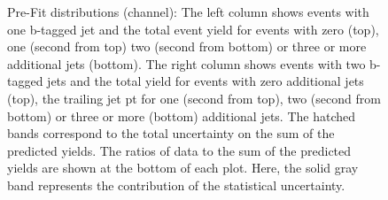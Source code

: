 \begin{figure}[htbp!]
\begin{center}
\caption{Pre-Fit distributions (\ee channel): 
  The left column shows events with one b-tagged jet and the total event yield for events with zero (top), one (second from top)
  two (second from bottom) or three or more additional jets (bottom).
  The right column shows events with two b-tagged jets and the total yield for events with zero additional jets (top),
  the trailing jet pt for one (second from top),
  two (second from bottom) or three or more (bottom) additional jets.
  The hatched bands correspond to the total uncertainty on the sum of
  the predicted yields. The ratios of data to the sum of the
  predicted yields are shown at the bottom of each plot. Here, the solid
  gray band represents the contribution of the statistical uncertainty.  
       \label{fig:xsec_ee_inputdistr}}
  \end{center}
\end{figure}


